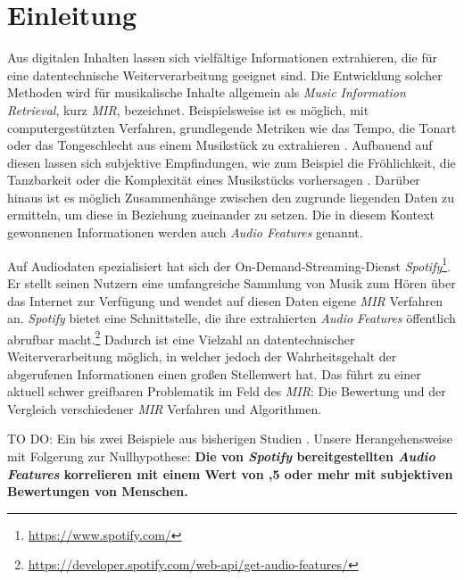 \section*{Einleitung}
\label{sec:Einleitung}
Aus digitalen Inhalten lassen sich vielfältige Informationen extrahieren, die für eine datentechnische Weiterverarbeitung geeignet sind.
Die Entwicklung solcher Methoden wird für musikalische Inhalte allgemein als \textit{Music Information Retrieval}, kurz \textit{MIR}, bezeichnet.
Beispielsweise ist es möglich, mit computergestützten Verfahren, grundlegende Metriken wie das Tempo, die Tonart oder das Tongeschlecht aus einem Musikstück zu extrahieren \cite{Casey2008}.
Aufbauend auf diesen lassen sich subjektive Empfindungen, wie zum Beispiel die Fröhlichkeit, die Tanzbarkeit oder die Komplexität eines Musikstücks vorhersagen \cite{Sturm2013}.
Darüber hinaus ist es möglich Zusammenhänge zwischen den zugrunde liegenden Daten zu ermitteln, um diese in Beziehung zueinander zu setzen.
Die in diesem Kontext gewonnenen Informationen werden auch \textit{Audio Features} genannt.

Auf Audiodaten spezialisiert hat sich der On-Demand-Streaming-Dienst \textit{Spotify}\footnote{\url{https://www.spotify.com/}}.
Er stellt seinen Nutzern eine umfangreiche Sammlung von Musik zum Hören über das Internet zur Verfügung und wendet auf diesen Daten eigene \textit{MIR} Verfahren an.
\textit{Spotify} bietet eine Schnittstelle, die ihre  extrahierten \textit{Audio Features} öffentlich abrufbar macht.\footnote{\url{https://developer.spotify.com/web-api/get-audio-features/}}
Dadurch ist eine Vielzahl an datentechnischer Weiterverarbeitung möglich, in welcher jedoch der Wahrheitsgehalt der abgerufenen Informationen einen großen Stellenwert hat.
Das führt zu einer aktuell schwer greifbaren Problematik im Feld des \textit{MIR}:
Die Bewertung und der Vergleich verschiedener \textit{MIR} Verfahren und Algorithmen.

TO DO:
Ein bis zwei Beispiele aus bisherigen Studien \cite{Downie2004} \cite{Urbano_2013}.
Unsere Herangehensweise mit Folgerung zur Nullhypothese:
\textbf{Die von \textit{Spotify} bereitgestellten \textit{Audio Features} korrelieren mit einem Wert von ,5 oder mehr mit subjektiven Bewertungen von Menschen.}